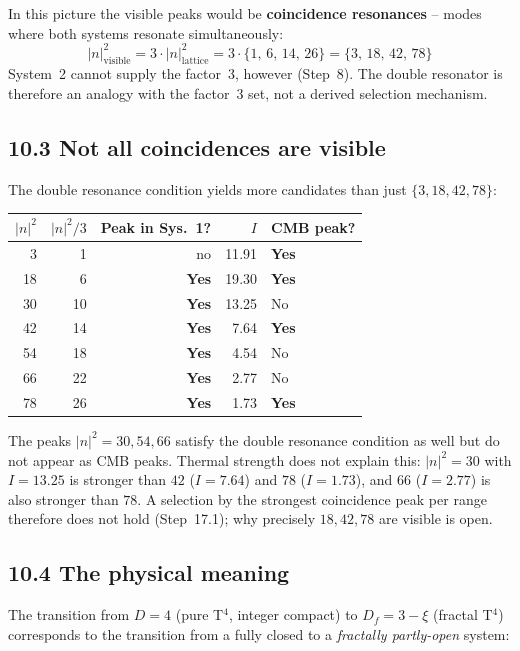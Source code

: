 In this picture the visible peaks would be \textbf{coincidence
resonances} -- modes where both systems resonate simultaneously:
\[
  |n|^2_\mathrm{visible}
  = 3 \cdot |n|^2_\mathrm{lattice}
  = 3 \cdot \{1,\,6,\,14,\,26\}
  = \{3,\,18,\,42,\,78\}
\]
System~2 cannot supply the factor~3, however (Step~8). The double resonator
is therefore an analogy with the factor~3 set, not a derived selection
mechanism.

\subsection*{10.3 Not all coincidences are visible}

The double resonance condition yields more candidates than just
$\{3, 18, 42, 78\}$:

\begin{center}
\begin{tabular}{rrrrl}
\toprule
$|n|^2$ & $|n|^2/3$ & Peak in Sys.~1? & $I$ & CMB peak? \\
\midrule
3  & 1  & no & 11{.}91 & \textbf{Yes} \\
18 & 6  & \textbf{Yes} & 19{.}30 & \textbf{Yes} \\
30 & 10 & \textbf{Yes} & 13{.}25 & No \\
42 & 14 & \textbf{Yes} & 7{.}64  & \textbf{Yes} \\
54 & 18 & \textbf{Yes} & 4{.}54  & No \\
66 & 22 & \textbf{Yes} & 2{.}77  & No \\
78 & 26 & \textbf{Yes} & 1{.}73  & \textbf{Yes} \\
\bottomrule
\end{tabular}
\end{center}

The peaks $|n|^2 = 30, 54, 66$ satisfy the double resonance condition as
well but do not appear as CMB peaks. Thermal strength does not explain this:
$|n|^2 = 30$ with $I = 13{.}25$ is stronger than $42$ ($I = 7{.}64$) and $78$
($I = 1{.}73$), and $66$ ($I = 2{.}77$) is also stronger than $78$. A
selection by the strongest coincidence peak per range therefore does not hold
(Step~17.1); why precisely $18, 42, 78$ are visible is open.

\subsection*{10.4 The physical meaning}

The transition from $D = 4$ (pure T$^4$, integer compact) to
$D_f = 3 - \xi$ (fractal T$^4$) corresponds to the transition from a
fully closed to a \emph{fractally partly-open} system:

